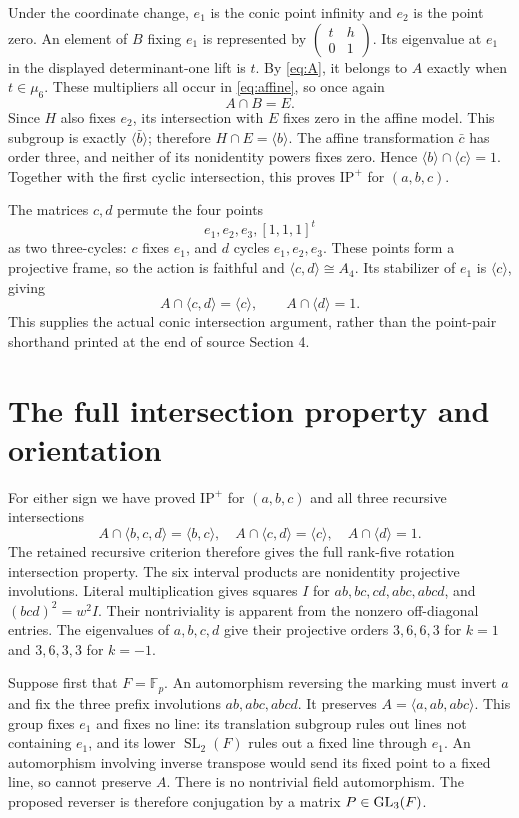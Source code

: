 \documentclass[11pt,a4paper]{article}
\newcommand{\SL}{\operatorname{SL}}\newcommand{\PSL}{\operatorname{PSL}}
\newcommand{\Fp}{\mathbb F_p}\newcommand{\PG}{\operatorname{PG}}
\newcommand{\ip}{\mathrm{IP}^{+}}
\begin{document}
Under the coordinate change, $e_1$ is the conic point infinity and
$e_2$ is the point zero. An element of $B$ fixing $e_1$ is represented
by $\begin{pmatrix}t&h\\0&1\end{pmatrix}$. Its eigenvalue at $e_1$
in the displayed determinant-one lift is $t$. By \eqref{eq:A}, it
belongs to $A$ exactly when $t\in\mu_6$. These multipliers all occur
in \eqref{eq:affine}, so once again
\[
                              A\cap B=E.
\]
Since $H$ also fixes $e_2$, its intersection with $E$ fixes zero in
the affine model. This subgroup is exactly $\langle\bar b\rangle$;
therefore $H\cap E=\langle b\rangle$. The affine transformation
$\bar c$ has order three, and neither of its nonidentity powers fixes
zero. Hence $\langle b\rangle\cap\langle c\rangle=1$. Together
with the first cyclic intersection, this proves $\ip$ for $(a,b,c)$.

The matrices $c,d$ permute the four points
\[
                  e_1,e_2,e_3,[1,1,1]^t
\]
as two three-cycles: $c$ fixes $e_1$, and $d$ cycles $e_1,e_2,e_3$.
These points form a projective frame, so the action is faithful and
$\langle c,d\rangle\cong A_4$. Its stabilizer of $e_1$ is
$\langle c\rangle$, giving
\[
 A\cap\langle c,d\rangle=\langle c\rangle,
 \qquad A\cap\langle d\rangle=1.
\]
This supplies the actual conic intersection argument, rather than the
point-pair shorthand printed at the end of source Section 4.

\section{The full intersection property and orientation}
For either sign we have proved $\ip$ for $(a,b,c)$ and all three
recursive intersections
\[
 A\cap\langle b,c,d\rangle=\langle b,c\rangle,\quad
 A\cap\langle c,d\rangle=\langle c\rangle,\quad
 A\cap\langle d\rangle=1.
\]
The retained recursive criterion therefore gives the full rank-five
rotation intersection property. The six interval products are
nonidentity projective involutions. Literal multiplication gives squares
$I$ for $ab,bc,cd,abc,abcd$, and $(bcd)^2=w^2I$. Their nontriviality
is apparent from the nonzero off-diagonal entries. The eigenvalues of
$a,b,c,d$ give their projective orders $3,6,6,3$ for $k=1$ and
$3,6,3,3$ for $k=-1$.

Suppose first that $F=\Fp$. An automorphism reversing the marking must
invert $a$ and fix the three prefix involutions $ab,abc,abcd$. It
preserves $A=\langle a,ab,abc\rangle$. This group fixes $e_1$ and
fixes no line: its translation subgroup rules out lines not containing
$e_1$, and its lower $\SL_2(F)$ rules out a fixed line through $e_1$.
An automorphism involving inverse transpose would send its fixed point
to a fixed line, so cannot preserve $A$. There is no nontrivial field
automorphism. The proposed reverser is therefore conjugation by a
matrix $P\in\operatorname{GL}_3(F)$.
\end{document}
